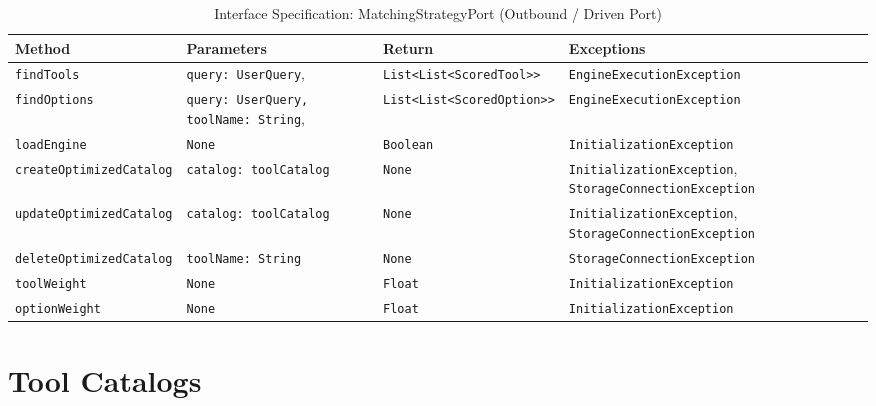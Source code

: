 \begin{appendix}
\begin{table}[htbp]
    \centering
    \caption{Interface Specification: MatchingStrategyPort (Outbound / Driven Port)}
    \label{tab:matching_strategy_port}
    \renewcommand{\arraystretch}{1.4}
    \begin{tabularx}{\textwidth}{|p{3.2cm}|X|X|X|}
        \hline
        \rowcolor{gray!10}
        \textbf{Method} & \textbf{Parameters} & \textbf{Return} & \textbf{Exceptions} \\
        \hline
        \texttt{find\-Tools} & \texttt{query: UserQuery}, \newline & \texttt{List\-<List\-<Scored\-Tool>>} & \texttt{Engine\-Execution\-Exception}\\
        \hline
        \texttt{find\-Options} & \texttt{query: UserQuery, toolName: String}, \newline & \texttt{List\-<List\-<Scored\-Option>>} & \texttt{Engine\-Execution\-Exception}\\
        \hline
        \texttt{load\-Engine} & \texttt{None} & \texttt{Boolean} & \texttt{Initialization\-Exception} \\
        \hline
        \texttt{create\-Optimized\-Catalog} & \texttt{catalog: toolCatalog} & \texttt{None} & \texttt{Initialization\-Exception}, \texttt{Storage\-Connection\-Exception} \\
        \hline
        \texttt{update\-Optimized\-Catalog} & \texttt{catalog: toolCatalog} & \texttt{None} & \texttt{Initialization\-Exception}, \texttt{Storage\-Connection\-Exception} \\
        \hline
        \texttt{delete\-Optimized\-Catalog} & \texttt{toolName: String} & \texttt{None} & \texttt{Storage\-Connection\-Exception} \\
        \hline
        \texttt{toolWeight} & \texttt{None} & \texttt{Float} & \texttt{Initialization\-Exception} \\
        \hline
        \texttt{optionWeight} & \texttt{None} & \texttt{Float} & \texttt{Initialization\-Exception} \\
        \hline
    \end{tabularx}
\end{table}
\FloatBarrier

\section{Tool Catalogs}\label{app:tool_catalogs}


\end{appendix}
